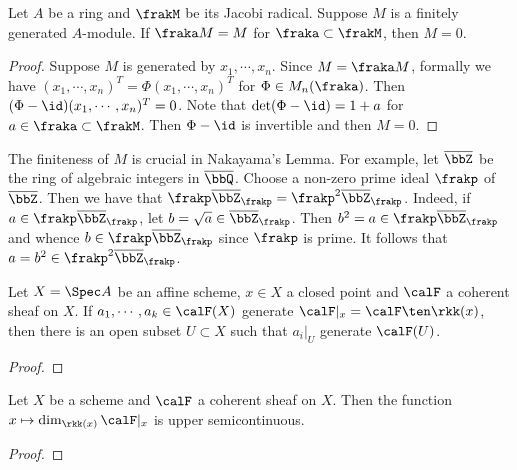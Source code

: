    \begin{theorem}\label{thm: Nakayama's lemma}
        Let $A$ be a ring and $\frakM$ be its Jacobi radical.
        Suppose $M$ is a finitely generated $A$-module.
        If $\fraka M = M$ for $\fraka \subset \frakM$, then $M = 0$.
    \end{theorem}
    \begin{proof}
        Suppose $M$ is generated by $x_1,\cdots,x_n$.
        Since $M = \fraka M$, formally we have $(x_1,\cdots,x_n)^T = \Phi (x_1,\cdots, x_n)^T$ for $\Phi \in M_n(\fraka)$.
        Then $(\Phi - \id) (x_1,\cdots, x_n)^T = 0$. 
        Note that $\det (\Phi - \id) = 1+a$ for $a \in \fraka \subset \frakM$.
        Then $\Phi-\id$ is invertible and then $M=0$.
    \end{proof}

    \begin{remark}\label{rem: counterexample of Nakayama's lemma when M is not finite}
        The finiteness of $M$ is crucial in Nakayama's Lemma.
        For example, let \(\overline{\bbZ}\) be the ring of algebraic integers in \(\overline{\bbQ}\).
        Choose a non-zero prime ideal \(\frakp\) of \(\overline{\bbZ}\).
        Then we have that \(\frakp \overline{\bbZ}_\frakp= \frakp^2 \overline{\bbZ}_\frakp\).
        Indeed, if \(a \in \frakp \overline{\bbZ}_\frakp\), let \(b = \sqrt{a} \in \overline{\bbZ}_\frakp\).
        Then \(b^2 = a \in \frakp \overline{\bbZ}_\frakp\) and whence \(b \in \frakp \overline{\bbZ}_\frakp\) since \(\frakp\) is prime.
        It follows that \(a = b^2 \in \frakp^2 \overline{\bbZ}_\frakp\).
    \end{remark}

    \begin{proposition}\label{prop: geometric form of Nakayama's lemma}
        Let $X = \Spec A$ be an affine scheme, $x\in X$ a closed point and $\calF$ a coherent sheaf on $X$.
        If $a_1,\cdots,a_k \in \calF(X)$ generate $\calF|_x = \calF \ten \rkk(x)$, then there is an open subset $U \subset X$ such that $a_i|_U$ generate $\calF(U)$. 
    \end{proposition}
    \begin{proof}
    \end{proof}

    \begin{corollary}\label{cor: upper semicontinuity of dimension of restriction of coherent sheaf to fiber}
        Let \(X\) be a scheme and \(\calF\) a coherent sheaf on \(X\).
        Then the function \(x \mapsto \dim_{\rkk(x)} \calF|_x\) is upper semicontinuous.
    \end{corollary}
    \begin{proof}
    \end{proof}

